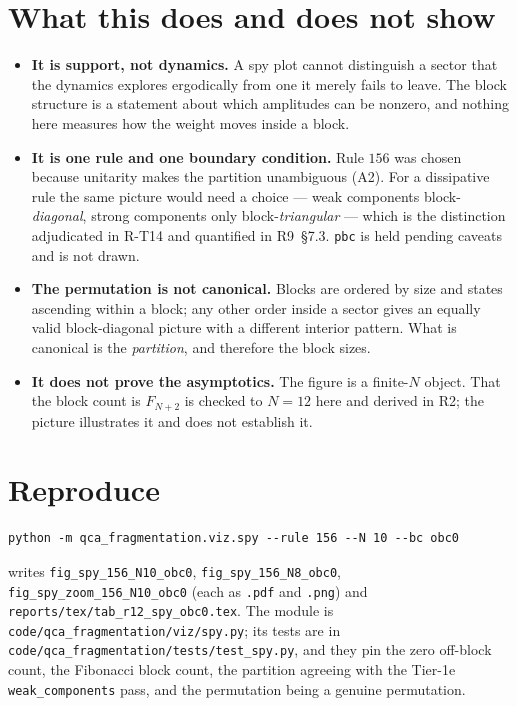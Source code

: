 \documentclass[11pt]{article}
\newcommand{\rt}[1]{\texttt{#1}}
\newcommand{\fn}[1]{\texttt{#1}}
\theoremstyle{plain}
\theoremstyle{definition}
\begin{document}
\section{What this does and does not show}

\begin{itemize}
\item \textbf{It is support, not dynamics.} A spy plot cannot distinguish a
  sector that the dynamics explores ergodically from one it merely fails to
  leave. The block structure is a statement about which amplitudes can be
  nonzero, and nothing here measures how the weight moves inside a block.
\item \textbf{It is one rule and one boundary condition.} Rule $156$ was chosen
  because unitarity makes the partition unambiguous (A2). For a dissipative rule
  the same picture would need a choice --- weak components block-\emph{diagonal},
  strong components only block-\emph{triangular} --- which is the distinction
  adjudicated in R-T14 and quantified in R9~\S7.3. \rt{pbc} is held pending
  caveats and is not drawn.
\item \textbf{The permutation is not canonical.} Blocks are ordered by size and
  states ascending within a block; any other order inside a sector gives an
  equally valid block-diagonal picture with a different interior pattern. What
  is canonical is the \emph{partition}, and therefore the block sizes.
\item \textbf{It does not prove the asymptotics.} The figure is a finite-$N$
  object. That the block count is $F_{N+2}$ is checked to $N=12$ here and derived
  in R2; the picture illustrates it and does not establish it.
\end{itemize}

\section{Reproduce}

\begin{verbatim}
python -m qca_fragmentation.viz.spy --rule 156 --N 10 --bc obc0
\end{verbatim}

\noindent writes \fn{fig\_spy\_156\_N10\_obc0}, \fn{fig\_spy\_156\_N8\_obc0},
\fn{fig\_spy\_zoom\_156\_N10\_obc0} (each as \fn{.pdf} and \fn{.png}) and
\fn{reports/tex/tab\_r12\_spy\_obc0.tex}. The module is
\fn{code/qca\_fragmentation/viz/spy.py}; its tests are in
\fn{code/qca\_fragmentation/tests/test\_spy.py}, and they pin the zero off-block
count, the Fibonacci block count, the partition agreeing with the Tier-1e
\fn{weak\_components} pass, and the permutation being a genuine permutation.
\end{document}
